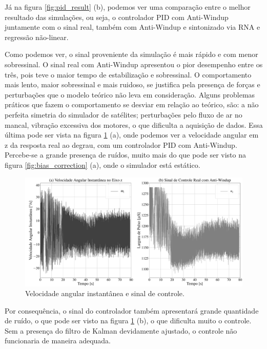 Já na figura \ref{fig:pid_result} (b), podemos ver uma comparação entre o melhor resultado das simulações, ou seja, o controlador PID com Anti-Windup juntamente com o sinal real, também com Anti-Windup e sintonizado via RNA e regressão não-linear.

Como podemos ver, o sinal proveniente da simulação é mais rápido e com menor sobressinal. O sinal real com Anti-Windup apresentou o pior desempenho entre os três, pois teve o maior tempo de estabilização e sobressinal. O comportamento mais lento, maior sobressinal e mais ruidoso, se justifica pela presença de forças e perturbações que o modelo teórico não leva em consideração. Alguns problemas práticos que fazem o comportamento se desviar em relação ao teórico, são: a não perfeita simetria do simulador de satélites; perturbações pelo fluxo de ar no mancal, vibração excessiva dos motores, o que dificulta a aquisição de dados. Essa última pode ser vista na figura \ref{fig:pid_result_controlller} (a), onde podemos ver a velocidade angular em z da resposta real ao degrau, com um controlador PID com Anti-Windup. Percebe-se a grande presença de ruídos, muito mais do que pode ser visto na figura \ref{fig:bias_correction} (a), onde o simulador está estático.

\begin{figure}[H]
  \caption{Velocidade angular instantânea e sinal de controle.}
  \begin{center}
      \includegraphics[scale=0.26]{resultados/img/pid_result_controller}
  \end{center}
  \label{fig:pid_result_controlller}
\end{figure}

Por consequência, o sinal do controlador também apresentará grande quantidade de ruído, o que pode ser visto na figura \ref{fig:pid_result_controlller} (b), o que dificulta muito o controle. Sem a presença do filtro de Kalman devidamente ajustado, o controle não funcionaria de maneira adequada.

